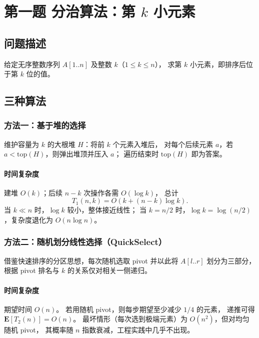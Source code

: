 \documentclass[12pt, a4paper]{ctexart}
\begin{document}
\newpage

\section{第一题 \; 分治算法：第 $k$ 小元素}

\subsection{问题描述}

给定无序整数序列 $A[1..n]$ 及整数 $k$（$1 \le k \le n$），
求第 $k$ 小元素，即排序后位于第 $k$ 位的值。

\subsection{三种算法}

\subsubsection{方法一：基于堆的选择}

维护容量为 $k$ 的大根堆 $H$：将前 $k$ 个元素入堆后，
对每个后续元素 $a$，若 $a < \mathrm{top}(H)$，则弹出堆顶并压入 $a$；
遍历结束时 $\mathrm{top}(H)$ 即为答案。

\paragraph{时间复杂度} 建堆 $O(k)$；后续 $n-k$ 次操作各需 $O(\log k)$，
总计
\[
  T_1(n, k) = O\!\left(k + (n-k)\log k\right).
\]
当 $k \ll n$ 时，$\log k$ 较小，整体接近线性；
当 $k = n/2$ 时，$\log k = \log(n/2)$，复杂度退化为 $O(n\log n)$。

\subsubsection{方法二：随机划分线性选择（QuickSelect）}

借鉴快速排序的分区思想，每次随机选取 pivot 并以此将 $A[l..r]$
划分为三部分，根据 pivot 排名与 $k$ 的关系仅对相关一侧递归。

\paragraph{时间复杂度}
期望时间 $O(n)$。
若用随机 pivot，则每步期望至少减少 $1/4$ 的元素，
递推可得 $\mathbf{E}[T_2(n)] = O(n)$。
最坏情形（每次选到极端元素）为 $O(n^2)$，但对均匀随机 pivot，
其概率随 $n$ 指数衰减，工程实践中几乎不出现。
\end{document}
